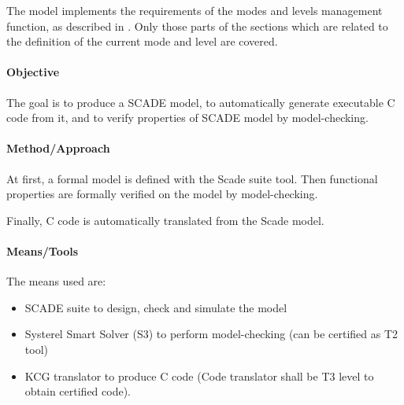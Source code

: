 The model implements the requirements of the modes and levels management
function, as described in \cite[Sec.~4,5]{subset-026:3.3.0}.
Only those parts of the sections which are related to the definition
of the current mode and level are covered.


\paragraph{Objective}


The goal is to produce a SCADE model, to automatically generate
executable C code from it, and to verify properties of SCADE model by
model-checking.



\paragraph{Method/Approach}

At first, a formal model is defined with the Scade suite tool.
Then functional properties are formally verified on the model by  model-checking.

Finally, C code is automatically translated from the Scade model.

\paragraph{Means/Tools}


The means used are:
\begin{itemize}
\item SCADE suite to  design, check and simulate the model 
\item Systerel Smart Solver (S3) to perform model-checking (can be certified as T2 tool)
\item KCG translator to produce C code (Code translator shall be T3 level to obtain certified code).
\end{itemize}


